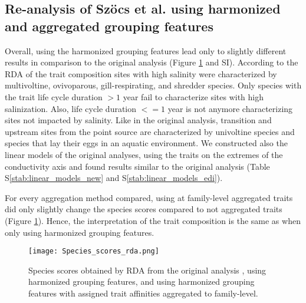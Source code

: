 \documentclass[../Draft_harmonization_paper.tex]{subfiles}
\begin{document}

\subsection*{Re-analysis of Szöcs et al. using harmonized and aggregated grouping features}

Overall, using the harmonized grouping features lead only to slightly different results in comparison to the original analysis (Figure \ref{fig:rda_species_scores} and SI). According to the RDA of the trait composition sites with high salinity were characterized by multivoltine, ovivoparous, gill-respirating, and shredder species. Only species with the trait life cycle duration $> 1$ year fail to characterize sites with high salinization. Also, life cycle duration $<= 1$ year is not anymore characterizing sites not impacted by salinity. Like in the original analysis, transition and upstream sites from the point source are characterized by univoltine species and species that lay their eggs in an aquatic environment. We constructed also the linear models of the original analyses, using the traits on the extremes of the conductivity axis and found results similar to the original analysis (Table S\ref{stab:linear_models_new} and S\ref{stab:linear_models_edi}).

For every aggregation method compared, using at family-level aggregated traits did only slightly change the species scores compared to not aggregated traits (Figure \ref{fig:rda_species_scores}). Hence, the interpretation of the trait composition is the same as when only using harmonized grouping features. 
 

\begin{figure}[H]
    \label{fig:rda_species_scores}
    \centering
    \texttt{[image: Species\_scores\_rda.png]}
    \caption{Species scores obtained by RDA from the original analysis \cite{szocs_effects_2014}, using harmonized grouping features, and using harmonized grouping features with assigned trait affinities aggregated to family-level.}
    \label{fig:rda_species_scores}
\end{figure}
\end{document}
